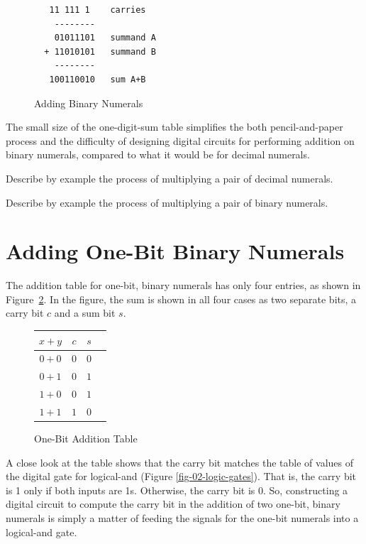 \begin{figure}
\begin{Verbatim}
   11 111 1    carries
    --------
    01011101   summand A
  + 11010101   summand B
    --------
   100110010   sum A+B
\end{Verbatim}
\caption{Adding Binary Numerals}
\label{fig:adding-binary-numerals}
\end{figure}

The small size of the one-digit-sum table simplifies the
both pencil-and-paper process and the difficulty of designing
digital circuits for performing addition on binary numerals, compared to what
it would be for decimal numerals.

\begin{ExerciseList}
\Exercise Describe by example the process of multiplying a pair of decimal numerals.

\Exercise Describe by example the process of multiplying a pair of binary numerals.
\end{ExerciseList}

\section{Adding One-Bit Binary Numerals}
\label{sec:adding-1-bit-numerals}

The addition table for one-bit, binary numerals
has only four entries, as shown in
Figure~\ref{fig:1-bit-add-table}.
In the figure, the sum is shown in all four cases as two separate bits,
a carry bit $c$ and a sum bit $s$.

\begin{figure}
\begin{center}
\begin{tabular}{|c|c|c|c}
 \hline
 $x+y$  & $c$ & $s$ \\
 \hline
 $0+0$  & $0$ & $0$ \\
 \hline
 $0+1$  & $0$ & $1$ \\
 \hline
 $1+0$  & $0$ & $1$ \\
 \hline
 $1+1$  & $1$ & $0$ \\
 \hline
\end{tabular}
\end{center}
\caption{One-Bit Addition Table}
\label{fig:1-bit-add-table}
\end{figure}

A close look at the table shows that
the carry bit matches the table of values of the
digital gate for logical-and (Figure \ref{fig-02-logic-gates}).
That is, the carry bit is 1 only if both inputs are 1s.
Otherwise, the carry bit is 0.
So, constructing a digital circuit to compute the carry bit
in the addition of two one-bit, binary numerals is simply
a matter of feeding the signals for the one-bit numerals
into a logical-and gate.

